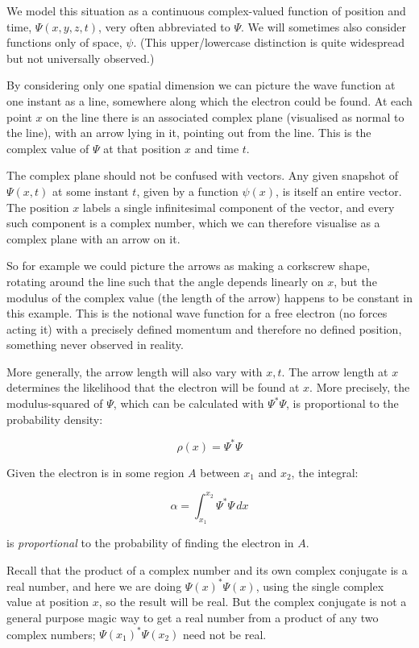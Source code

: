 We model this situation as a continuous complex-valued function of position and time, $\Psi(x, y, z, t)$, very often abbreviated to $\Psi$. We will sometimes also consider functions only of space, $\psi$. (This upper/lowercase distinction is quite widespread but not universally observed.)

By considering only one spatial dimension we can picture the wave function at one instant as a line, somewhere along which the electron could be found. At each point $x$ on the line there is an associated complex plane (visualised as normal to the line), with an arrow lying in it, pointing out from the line. This is the complex value of $\Psi$ at that position $x$ and time $t$.

The complex plane should not be confused with vectors. Any given snapshot of $\Psi(x, t)$ at some instant $t$, given by a function $\psi(x)$, is itself an entire vector. The position $x$ labels a single infinitesimal component of the vector, and every such component is a complex number, which we can therefore visualise as a complex plane with an arrow on it.

So for example we could picture the arrows as making a corkscrew shape, rotating around the line such that the angle depends linearly on $x$, but the modulus of the complex value (the length of the arrow) happens to be constant in this example. This is the notional wave function for a free electron (no forces acting it) with a precisely defined momentum and therefore no defined position, something never observed in reality.

More generally, the arrow length will also vary with $x, t$. The arrow length at $x$ determines the likelihood that the electron will be found at $x$. More precisely, the modulus-squared of $\Psi$, which can be calculated with $\Psi^*\Psi$, is proportional to the probability density:

\begin{equation}
  \rho(x) = \Psi^*\Psi
  \label{eqn:pdf}
\end{equation}

Given the electron is in some region $A$ between $x_1$ and $x_2$, the integral:

$$
\alpha =
\int_{x_1}^{x_2}
\Psi^*\Psi
\,dx
$$

is \textit{proportional} to the probability of finding the electron in $A$.

Recall that the product of a complex number and its own complex conjugate is a real number, and here we are doing $\Psi(x)^*\Psi(x)$, using the single complex value at position $x$, so the result will be real. But the complex conjugate is not a general purpose magic way to get a real number from a product of any two complex numbers; $\Psi(x_1)^*\Psi(x_2)$ need not be real.

